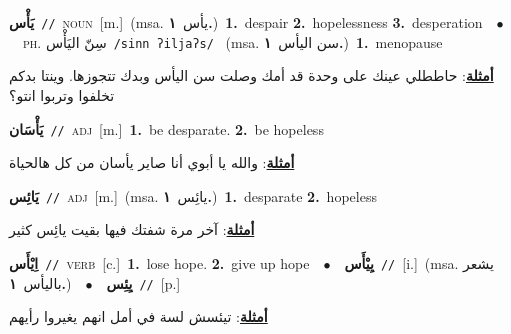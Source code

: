 \documentclass[10pt,a4paper,twoside]{article} %
\begin{document}
\begin{multicols}{2}
{\setlength\topsep{0pt}\textbf{\foreignlanguage{arabic}{يَأْس}}\ {\color{gray}\texttt{//}\color{black}}\ \textsc{noun}\ [m.]\ \color{gray}(msa. \foreignlanguage{arabic}{يأس}~\foreignlanguage{arabic}{\textbf{١.}})\color{black}\ \textbf{1.}~despair  \textbf{2.}~hopelessness  \textbf{3.}~desperation\ \ $\bullet$\ \ \textsc{ph.} \color{gray} \foreignlanguage{arabic}{سِنّ اليَأْس}\color{black}\ {\color{gray}\texttt{/{\sffamily sinn ʔiljaʔs}/}\color{black}}\ \color{gray} (msa. \foreignlanguage{arabic}{سن اليأس}~\foreignlanguage{arabic}{\textbf{١.}})\color{black}\ \textbf{1.}~menopause\  \begin{flushright}\color{gray}\foreignlanguage{arabic}{\textbf{\underline{\foreignlanguage{arabic}{أمثلة}}}: حاططلي عينك على وحدة قد أمك وصلت سن اليأس وبدك تتجوزها. وينتا بدكم تخلفوا وتربوا انتو؟}\end{flushright}\color{black}} \vspace{2mm}

{\setlength\topsep{0pt}\textbf{\foreignlanguage{arabic}{يَأْسَان}}\ {\color{gray}\texttt{//}\color{black}}\ \textsc{adj}\ [m.]\ \textbf{1.}~be desparate.  \textbf{2.}~be hopeless\  \begin{flushright}\color{gray}\foreignlanguage{arabic}{\textbf{\underline{\foreignlanguage{arabic}{أمثلة}}}: والله يا أبوي أنا صاير يأسان من كل هالحياة}\end{flushright}\color{black}} \vspace{2mm}

{\setlength\topsep{0pt}\textbf{\foreignlanguage{arabic}{يَائِس}}\ {\color{gray}\texttt{//}\color{black}}\ \textsc{adj}\ [m.]\ \color{gray}(msa. \foreignlanguage{arabic}{يائِس}~\foreignlanguage{arabic}{\textbf{١.}})\color{black}\ \textbf{1.}~desparate  \textbf{2.}~hopeless\  \begin{flushright}\color{gray}\foreignlanguage{arabic}{\textbf{\underline{\foreignlanguage{arabic}{أمثلة}}}: آخر مرة شفتك فيها بقيت يائِس كثير}\end{flushright}\color{black}} \vspace{2mm}

{\setlength\topsep{0pt}\textbf{\foreignlanguage{arabic}{اِيْأَس}}\ {\color{gray}\texttt{//}\color{black}}\ \textsc{verb}\ [c.]\ \textbf{1.}~lose hope.  \textbf{2.}~give up hope\ \ $\bullet$\ \ \setlength\topsep{0pt}\textbf{\foreignlanguage{arabic}{يِيْأَس}}\ {\color{gray}\texttt{//}\color{black}}\ [i.]\ \color{gray}(msa. \foreignlanguage{arabic}{يشعر باليأس}~\foreignlanguage{arabic}{\textbf{١.}})\color{black}\ \ $\bullet$\ \ \setlength\topsep{0pt}\textbf{\foreignlanguage{arabic}{يِئِس}}\ {\color{gray}\texttt{//}\color{black}}\ [p.]\  \begin{flushright}\color{gray}\foreignlanguage{arabic}{\textbf{\underline{\foreignlanguage{arabic}{أمثلة}}}: تيئسش لسة في أمل انهم يغيروا رأيهم}\end{flushright}\color{black}} \vspace{2mm}


\end{multicols}
\end{document}
